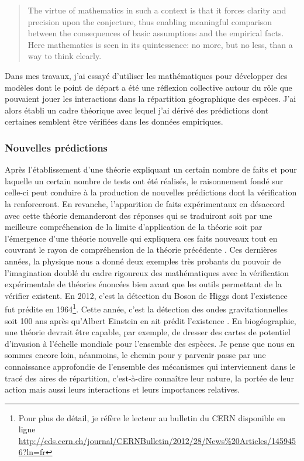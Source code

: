 \begin{quote}
The virtue of mathematics in such a context is that it forces clarity
and precision upon the conjecture, thus enabling meaningful comparison
between the consequences of basic assumptions and the empirical facts.
Here mathematics is seen in its quintessence: no more, but no less, than
a way to think clearly.
\end{quote}

Dans mes travaux, j'ai essayé d'utiliser les mathématiques pour
développer des modèles dont le point de départ a été une réflexion
collective autour du rôle que pouvaient jouer les interactions dans la
répartition géographique des espèces. J'ai alors établi un cadre
théorique avec lequel j'ai dérivé des prédictions dont certaines
semblent être vérifiées dans les données empiriques.

\subsubsection*{Nouvelles prédictions}\label{nouvelles-pruxe9dictions}

Après l'établissement d'une théorie expliquant un certain nombre de
faits et pour laquelle un certain nombre de tests ont été réalisés, le
raisonnement fondé sur celle-ci peut conduire à la production de
nouvelles prédictions dont la vérification la renforceront. En revanche,
l'apparition de faits expérimentaux en désaccord avec cette théorie
demanderont des réponses qui se traduiront soit par une meilleure
compréhension de la limite d'application de la théorie soit par
l'émergence d'une théorie nouvelle qui expliquera ces faits nouveaux
tout en couvrant le rayon de compréhension de la théorie précédente
\citep{Popper1959}. Ces dernières années, la physique nous a donné deux
exemples très probants du pouvoir de l'imagination doublé du cadre
rigoureux des mathématiques avec la vérification expérimentale de
théories énoncées bien avant que les outils permettant de la vérifier
existent. En 2012, c'est la détection du Boson de Higgs dont l'existence
fut prédite en 1964\footnote{Pour plus de détail, je réfère le lecteur
  au bulletin du CERN disponible en ligne
  \url{http://cds.cern.ch/journal/CERNBulletin/2012/28/News\%20Articles/1459456?ln=fr}}.
Cette année, c'est la détection des ondes gravitationnelles soit 100 ans
après qu'Albert Einstein en ait prédit l'existence \citep{Waldrop2016}.
En biogéographie, une théorie devrait être capable, par exemple, de
dresser des cartes de potentiel d'invasion à l'échelle mondiale pour
l'ensemble des espèces. Je pense que nous en sommes encore loin,
néanmoins, le chemin pour y parvenir passe par une connaissance
approfondie de l'ensemble des mécanismes qui interviennent dans le tracé
des aires de répartition, c'est-à-dire connaître leur nature, la portée
de leur action mais aussi leurs interactions et leurs importances
relatives.

